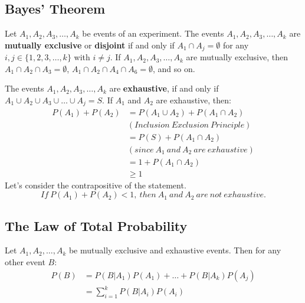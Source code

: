 \documentclass[letterpaper, 12pt]{math}
\begin{document}
\subsection*{Bayes' Theorem}
Let \( A_{1}, A_{2}, A_{3}, \dots, A_{k} \) be events of an experiment.
The events \( A_{1}, A_{2}, A_{3}, \dots, A_{k} \) are \textbf{mutually
exclusive} or \textbf{disjoint} if and only if \( A_{1} \cap A_{j} =
\emptyset \) for any \( i, j \in \{1, 2, 3, \dots, k \} \) with \( i \neq j \).
If \( A_{1}, A_{2}, A_{3}, \dots, A_{k} \) are mutually exclusive, then
\( A_{1} \cap A_{2} \cap A_{3} = \emptyset \), \( A_{1} \cap A_{2} \cap A_{4}
\cap A_{6} = \emptyset \), and so on. \par
The events \( A_{1}, A_{2}, A_{3}, \dots, A_{k} \) are \textbf{exhaustive},
if and only if \( A_{1} \cup A_{2} \cup A_{3} \cup \dots \cup A_{j} = S \).
If \( A_{1} \) and \( A_{2} \) are exhaustive, then:
\begin{align*}
  P(A_{1})+P(A_{2}) &= P(A_{1} \cup A_{2})+P(A_{1} \cap A_{2}) \\
  &(Inclusion\ Exclusion\ Principle) \\
  &= P(S)+P(A_{1} \cap A_{2}) \\
  &(since\ A_{1}\ and\ A_{2}\ are\ exhaustive) \\
  &= 1+P(A_{1} \cap A_{2}) \\
  &\geq 1
\end{align*}
Let's consider the contrapositive of the statement.
\[ If\ P(A_{1})+P(A_{2}) < 1,\ then\ A_{1}\ and\ A_{2}\ are\ not\ exhaustive. \]

\subsection*{The Law of Total Probability}
Let \( A_{1}, A_{2}, \dots, A_{k} \) be mutually exclusive and exhaustive
events. Then for any other event \( B \):
\begin{align*}
  P(B) &= P(B|A_{1})P(A_{1})+\dots+P(B|A_{k})P(A_{j}) \\
  &= \sum_{i=1}^{k}P(B|A_{i})P(A_{i})
\end{align*}
\end{document}
